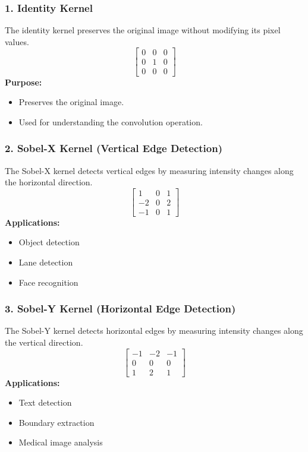 \documentclass[11pt]{article}
\begin{document}
\subsubsection*{1. Identity Kernel}
The identity kernel preserves the original image without modifying its pixel values. 
$$ \begin{bmatrix} 0 & 0 & 0 \\ 0 & 1 & 0 \\ 0 & 0 & 0 \end{bmatrix} $$
\textbf{Purpose:}
\begin{itemize}
    \item Preserves the original image. 
    \item Used for understanding the convolution operation. 
\end{itemize}

\subsubsection*{2. Sobel-X Kernel (Vertical Edge Detection)}
The Sobel-X kernel detects vertical edges by measuring intensity changes along the horizontal direction. 
$$ \begin{bmatrix} 1 & 0 & 1 \\ -2 & 0 & 2 \\ -1 & 0 & 1 \end{bmatrix} $$
\textbf{Applications:}
\begin{itemize}
    \item Object detection 
    \item Lane detection 
    \item Face recognition 
\end{itemize}

\subsubsection*{3. Sobel-Y Kernel (Horizontal Edge Detection)}
The Sobel-Y kernel detects horizontal edges by measuring intensity changes along the vertical direction. 
$$ \begin{bmatrix} -1 & -2 & -1 \\ 0 & 0 & 0 \\ 1 & 2 & 1 \end{bmatrix} $$
\textbf{Applications:}
\begin{itemize}
    \item Text detection 
    \item Boundary extraction 
    \item Medical image analysis 
\end{itemize}
\end{document}
